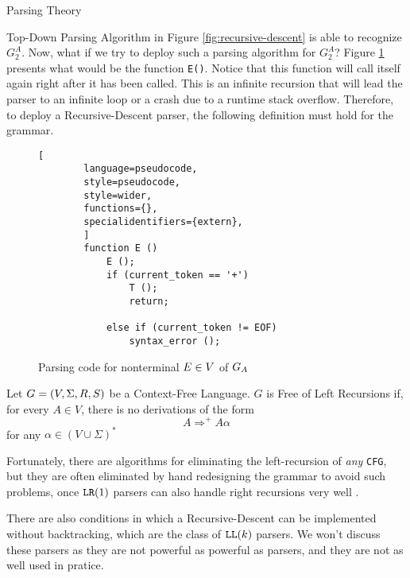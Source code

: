 \begin{section}{Parsing Theory}
\begin{subsection}{Top-Down Parsing}
Algorithm in Figure \ref{fig:recursive-descent} is able to recognize $G_2^A$.
Now, what if we try to deploy such a parsing algorithm for $G_2^A$? Figure
\ref{fig:recursive_descent_2} presents what would be the function \texttt{E()}.
Notice that this function will call itself again right after it has been
called. This is an infinite recursion that will lead the parser to an infinite
loop or a crash due to a runtime stack overflow. Therefore, to deploy a
Recursive-Descent parser, the following definition must hold for the grammar.

\begin{figure}[ht]
	\centering
	\begin{lstlisting}[
		language=pseudocode,
		style=pseudocode,
		style=wider,
		functions={},
		specialidentifiers={extern},
		]
		function E ()
			E ();
			if (current_token == '+')
				T ();
				return;
			
			else if (current_token != EOF)
				syntax_error ();
	\end{lstlisting}
\caption{Parsing code for nonterminal $\protect E \in V$ of $\protect G_A$ }
\label{fig:recursive_descent_2}
\end{figure}

\begin{definition}
	Let $G = (V, \Sigma, R, S)$ be a Context-Free Language. $G$ is Free of
	Left Recursions if, for every $A \in V$, there is no derivations
	of the form
	$$ A \Rightarrow^+ A \alpha$$
	for any $\alpha \in (V \cup \Sigma)^*$
\end{definition}

Fortunately, there are algorithms for eliminating the left-recursion of
\textit{any} \texttt{CFG}, but they are often eliminated by hand redesigning
the grammar to avoid such problems, once $\texttt{LR}(1)$ parsers can also handle
right recursions very well \citep{dragonbook}.

There are also conditions in which a Recursive-Descent can be implemented
without backtracking, which are the class of $\texttt{LL}(k)$ parsers. We
won't discuss these parsers as they are not powerful as powerful
as  parsers, and they are not as well used in pratice.

\end{subsection}
\end{section}


